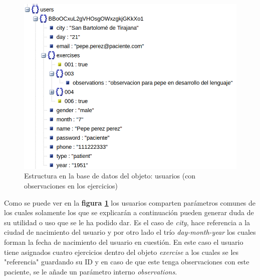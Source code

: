 \medskip
\begin{figure}
    \includegraphics[width=\linewidth]{./images/users-patient-with-observations-database.png}
    \caption{Estructura en la base de datos del objeto: usuarios (con observaciones en los ejercicios)}
    \label{usuario-con-observaciones}
\end{figure}

Como se puede ver en la \textbf{figura \ref{usuario-con-observaciones}}
los usuarios comparten parámetros comunes de los cuales solamente los que
se explicarán a continuación pueden generar duda de su utilidad o uso que se
le ha podido dar. Es el caso de \textit{city}, hace referencia a la ciudad de
nacimiento del usuario y por otro lado el trío \textit{day-month-year} los
cuales forman la fecha de nacimiento del usuario en cuestión.
En este caso el usuario tiene asignados cuatro ejercicios dentro del objeto
\textit{exercise} a los cuales se les "referencia" guardando su ID y en caso
de que este tenga observaciones con este paciente, se le añade un parámetro
interno \textit{observations}.


